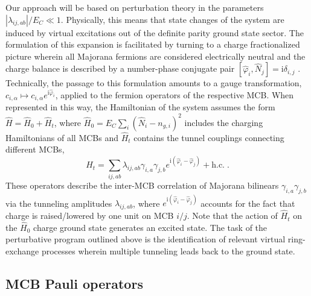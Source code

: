 \documentclass[twocolumn,floats,prx,showpacs]{revtex4-1}
\begin{document}
Our approach will be based on perturbation theory in the parameters $|\lambda_{ij,ab}|/E_C \ll 1$. Physically, this means that state changes of the system are induced by virtual excitations out of the definite parity ground state sector. The formulation of this expansion is facilitated by turning to a charge fractionalized picture wherein all Majorana fermions are considered electrically neutral and the charge balance is described by a number-phase conjugate pair $[\hat\varphi_i,\hat N_j] ={\mathrm i}
\delta_{i,j}$ \cite{Fu2010,Altland2013,Beri2013}. Technically, the passage to this formulation amounts to a gauge transformation, $c_{i,\alpha} \mapsto c_{i,\alpha} e^{\mathrm i\hat\varphi_i}$, applied to the fermion operators of the respective MCB. When represented in this way, the Hamiltonian of the system assumes the form    
$\hat H=\hat  H_0 +  \hat H_t$,
where $\hat H_0=E_C \sum_i (\hat N_i-n_{g,i})^2$ includes the charging Hamiltonians of all MCBs and $\hat H_t$ contains the tunnel couplings connecting different MCBs,
\begin{equation}\label{eq:V}
 \hat H_t=\sum_{ij,ab} \lambda_{ij,ab} \gamma_{i,a} \gamma_{j,b} e^{\mathrm i(\hat \varphi_i - \hat \varphi_j)} +\mathrm{h.c.}\;.
\end{equation}
These operators describe the inter-MCB correlation of Majorana bilinears $\gamma_{i,a} \gamma_{j,b}$ via the tunneling amplitudes $\lambda_{ij,ab}$, where  $e^{\mathrm i(\hat \varphi_i - \hat \varphi_j)}$ accounts for the fact that charge is raised/lowered by one unit on MCB $i/j$. Note that the action of $\hat H_t$ on the 
$\hat H_0$ charge ground state generates an excited state. The task of the perturbative program outlined above is the identification of relevant virtual ring-exchange processes wherein multiple tunneling leads back to the ground state.
 
\subsection{MCB Pauli operators}\label{sec2c}
\end{document}

